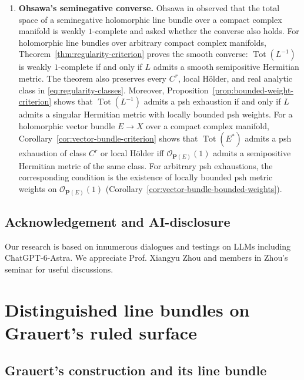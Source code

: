 \documentclass[11pt]{amsart}
\theoremstyle{definition}
\theoremstyle{remark}
\numberwithin{equation}{section}
\newcommand{\OO}{\mathcal O}
\newcommand{\Tot}{\operatorname{Tot}}
\begin{document}
\begin{enumerate}[label=\textbf{(\roman*)},widest=iii,leftmargin=*]
\item \textbf{Ohsawa's seminegative converse.}
Ohsawa in \cite[\S6]{Ohsawa2021} observed that the total space of a seminegative
holomorphic line bundle over a compact complex manifold
is weakly $1$-complete and asked whether the converse also holds.
For holomorphic line bundles over arbitrary
compact complex manifolds,
Theorem~\ref{thm:regularity-criterion} proves the smooth
converse: $\Tot(L^{-1})$ is weakly $1$-complete if and only
if $L$ admits a smooth semipositive Hermitian metric.
The theorem also preserves every $C^r$, local H\"older,
and real analytic class in \eqref{eq:regularity-classes}. Moreover,
Proposition~\ref{prop:bounded-weight-criterion} shows that
$\Tot(L^{-1})$ admits a psh exhaustion if and only if
$L$ admits a singular Hermitian metric with locally bounded
psh weights.
For a holomorphic vector bundle $E\to X$ over a compact
complex manifold,
Corollary~\ref{cor:vector-bundle-criterion} shows that
$\Tot(E^*)$ admits a psh exhaustion of class $C^r$ or
local H\"older iff $\OO_{\mathbf{P}(E)}(1)$ admits
a semipositive Hermitian metric of the same class.
For arbitrary psh exhaustions, the corresponding condition
is the existence of locally bounded psh metric weights
on $\OO_{\mathbf{P}(E)}(1)$
(Corollary~\ref{cor:vector-bundle-bounded-weights}).
\end{enumerate}

\subsection*{Acknowledgement and AI-disclosure}
Our research is based on innumerous dialogues and testings on LLMs including ChatGPT-6-Astra. We appreciate Prof. Xiangyu Zhou and members in Zhou's seminar for useful discussions.

\section{Distinguished line bundles on Grauert's ruled surface}\label{sec:metrics}

\subsection{Grauert's construction and its line bundle}\label{sec:ruled}
\end{document}
